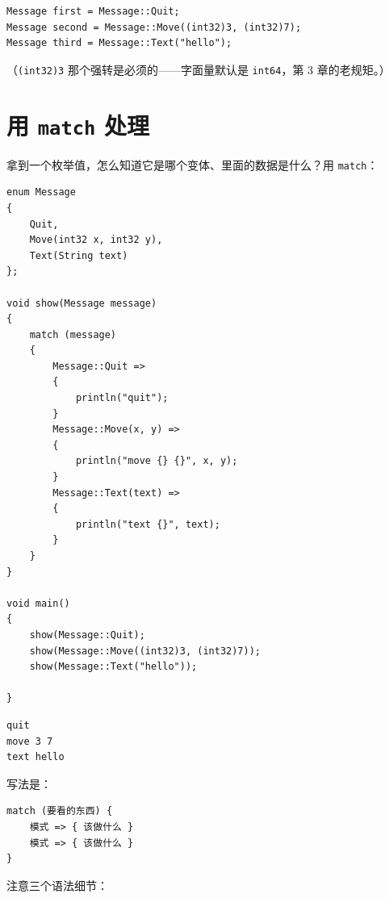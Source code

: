 \par
\medskip
\begin{lstlisting}[style=chali]
Message first = Message::Quit;
Message second = Message::Move((int32)3, (int32)7);
Message third = Message::Text("hello");
\end{lstlisting}
\par
\medskip

（\texttt{(\allowbreak{}int32)\allowbreak{}3} 那个强转是必须的——字面量默认是 \texttt{int64}，第 3 章的老规矩。）

\section{用 \texttt{match} 处理}

拿到一个枚举值，怎么知道它是哪个变体、里面的数据是什么？用 \texttt{match}：

\par
\medskip
\begin{lstlisting}[style=chali]
enum Message
{
    Quit,
    Move(int32 x, int32 y),
    Text(String text)
};

void show(Message message)
{
    match (message)
    {
        Message::Quit =>
        {
            println("quit");
        }
        Message::Move(x, y) =>
        {
            println("move {} {}", x, y);
        }
        Message::Text(text) =>
        {
            println("text {}", text);
        }
    }
}

void main()
{
    show(Message::Quit);
    show(Message::Move((int32)3, (int32)7));
    show(Message::Text("hello"));

}
\end{lstlisting}
\par
\medskip

\par
\medskip
\begin{lstlisting}[style=out]
quit
move 3 7
text hello
\end{lstlisting}
\par
\medskip

写法是：

\par
\medskip
\begin{lstlisting}[style=out]
match (要看的东西) {
    模式 => { 该做什么 }
    模式 => { 该做什么 }
}
\end{lstlisting}
\par
\medskip

注意三个语法细节：

